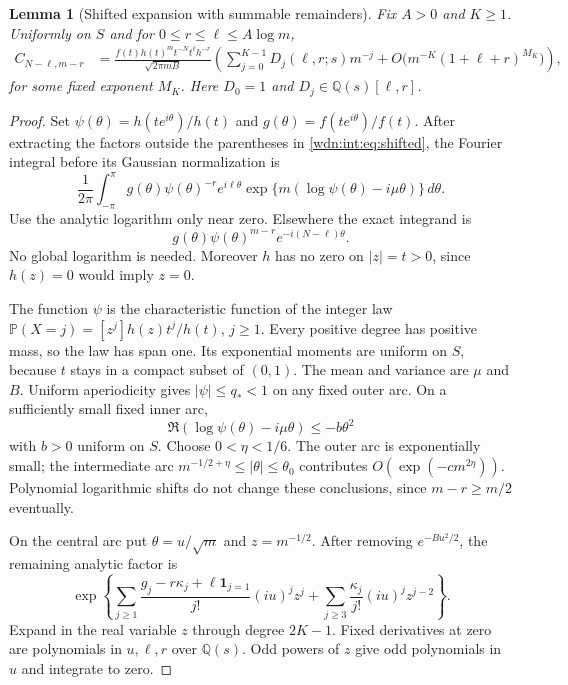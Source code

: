 \documentclass[11pt,letterpaper]{article}
\newtheorem{lemma}[theorem]{Lemma}
\theoremstyle{remark}\newtheorem{remark}[theorem]{Remark}
\newcommand{\Q}{\mathbb Q}
\newcommand{\Prob}{\mathbb P}
\begin{document}
\begin{lemma}[Shifted expansion with summable remainders]\label{wdn:int:lem:saddle}
Fix $A>0$ and $K\ge1$. Uniformly on $S$ and for
$0\le r\le\ell\le A\log m$,
\begin{align}
 C_{N-\ell,m-r}
 &=\frac{f(t)h(t)^mt^{-N}t^\ell h^{-r}}{\sqrt{2\pi mB}}
 \left(\sum_{j=0}^{K-1}D_j(\ell,r;s)m^{-j}
  +O\bigl(m^{-K}(1+\ell+r)^{M_K}\bigr)\right),\label{wdn:int:eq:shifted}
\end{align}
for some fixed exponent $M_K$. Here $D_0=1$ and
$D_j\in\Q(s)[\ell,r]$.
\end{lemma}
\begin{proof}
Set $\psi(\theta)=h(te^{i\theta})/h(t)$ and
$g(\theta)=f(te^{i\theta})/f(t)$. After extracting the factors outside the
parentheses in \eqref{wdn:int:eq:shifted}, the Fourier integral before its Gaussian
normalization is
\begin{equation}\label{wdn:int:eq:Fourier}
 \frac1{2\pi}\int_{-\pi}^{\pi}
 g(\theta)\psi(\theta)^{-r}e^{i\ell\theta}
 \exp\{m(\log\psi(\theta)-i\mu\theta)\}\,d\theta.
\end{equation}
Use the analytic logarithm only near zero. Elsewhere the exact integrand
is
\[
 g(\theta)\psi(\theta)^{m-r}e^{-i(N-\ell)\theta}.
\]
No global logarithm is needed. Moreover $h$ has no zero on $|z|=t>0$,
since $h(z)=0$ would imply $z=0$.

The function $\psi$ is the characteristic function of the integer law
$\Prob(X=j)=[z^j]h(z)t^j/h(t)$, $j\ge1$. Every positive degree has positive
mass, so the law has span one. Its exponential moments are uniform on $S$,
because $t$ stays in a compact subset of $(0,1)$. The mean and variance
are $\mu$ and $B$. Uniform aperiodicity gives $|\psi|\le q_*<1$ on any
fixed outer arc. On a sufficiently small fixed inner arc,
\[
 \Re(\log\psi(\theta)-i\mu\theta)\le-b\theta^2
\]
with $b>0$ uniform on $S$. Choose $0<\eta<1/6$. The outer arc is
exponentially small; the intermediate arc
$m^{-1/2+\eta}\le|\theta|\le\theta_0$ contributes
$O(\exp(-c m^{2\eta}))$. Polynomial logarithmic shifts do not change
these conclusions, since $m-r\ge m/2$ eventually.

On the central arc put $\theta=u/\sqrt m$ and $z=m^{-1/2}$. After
removing $e^{-Bu^2/2}$, the remaining analytic factor is
\begin{equation}\label{wdn:int:eq:Gaussianexp}
 \exp\left\{
 \sum_{j\ge1}\frac{g_j-r\kappa_j+\ell\mathbf1_{j=1}}{j!}(iu)^jz^j
 +\sum_{j\ge3}\frac{\kappa_j}{j!}(iu)^jz^{j-2}
 \right\}.
\end{equation}
Expand in the real variable $z$ through degree $2K-1$. Fixed derivatives
at zero are polynomials in $u,\ell,r$ over $\Q(s)$. Odd powers of $z$
give odd polynomials in $u$ and integrate to zero.


\end{proof}
\end{document}
